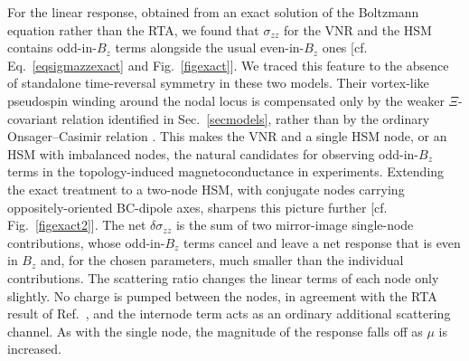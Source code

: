 \documentclass[aps,prb,onecolumn,nofootinbib,citeautoscript,10pt]{revtex4-2}
\begin{document}
For the linear response, obtained from an exact solution of the Boltzmann equation rather than the RTA, we found that $\sigma_{zz}$ for the VNR and the HSM contains odd-in-$B_z$ terms alongside the usual even-in-$ B_z $ ones [cf. Eq.~\eqref{eqsigmazzexact} and Fig.~\ref{figexact}]. We traced this feature to the absence of standalone time-reversal symmetry in these two models. Their vortex-like pseudospin winding around the nodal locus is compensated only by the weaker $\Xi$-covariant relation identified in Sec.~\ref{secmodels}, rather than by the ordinary Onsager--Casimir relation \cite{onsager1, onsager2, onsager3}. This makes the VNR and a single HSM node, or an HSM with imbalanced nodes, the natural candidates for observing odd-in-$B_z$ terms in the topology-induced magnetoconductance in experiments. Extending the exact treatment to a two-node HSM, with conjugate nodes carrying oppositely-oriented BC-dipole axes, sharpens this picture further [cf. Fig.~\ref{figexact2}]. The net $\delta \sigma_{zz}$ is the sum of two mirror-image single-node contributions, whose odd-in-$B_z$ terms cancel and leave a net response that is even in $B_z$ and, for the chosen parameters, much smaller than the individual contributions. The scattering ratio changes the linear terms of each node only slightly. No charge is pumped between the nodes, in agreement with the RTA result of Ref.~\cite{ips-firdous-vnr}, and the internode term acts as an ordinary additional scattering channel. As with the single node, the magnitude of the response falls off as $\mu$ is increased.
\end{document}
